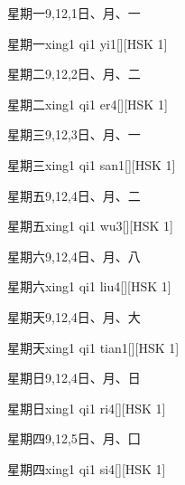 \begin{entry}{星期一}{9,12,1}{⽇、⽉、⼀}
  \begin{phonetics}{星期一}{xing1 qi1 yi1}[][HSK 1]
  \end{phonetics}
\end{entry}

\begin{entry}{星期二}{9,12,2}{⽇、⽉、⼆}
  \begin{phonetics}{星期二}{xing1 qi1 er4}[][HSK 1]
  \end{phonetics}
\end{entry}

\begin{entry}{星期三}{9,12,3}{⽇、⽉、⼀}
  \begin{phonetics}{星期三}{xing1 qi1 san1}[][HSK 1]
  \end{phonetics}
\end{entry}

\begin{entry}{星期五}{9,12,4}{⽇、⽉、⼆}
  \begin{phonetics}{星期五}{xing1 qi1 wu3}[][HSK 1]
  \end{phonetics}
\end{entry}

\begin{entry}{星期六}{9,12,4}{⽇、⽉、⼋}
  \begin{phonetics}{星期六}{xing1 qi1 liu4}[][HSK 1]
  \end{phonetics}
\end{entry}

\begin{entry}{星期天}{9,12,4}{⽇、⽉、⼤}
  \begin{phonetics}{星期天}{xing1 qi1 tian1}[][HSK 1]
  \end{phonetics}
\end{entry}

\begin{entry}{星期日}{9,12,4}{⽇、⽉、⽇}
  \begin{phonetics}{星期日}{xing1 qi1 ri4}[][HSK 1]
  \end{phonetics}
\end{entry}

\begin{entry}{星期四}{9,12,5}{⽇、⽉、⼞}
  \begin{phonetics}{星期四}{xing1 qi1 si4}[][HSK 1]
  \end{phonetics}
\end{entry}

